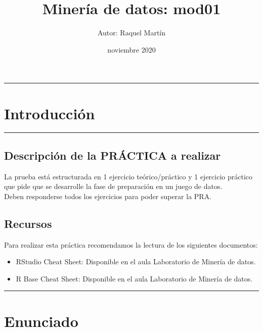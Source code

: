 \documentclass[]{article}
\title{Minería de datos: mod01}
\author{Autor: Raquel Martín}
\date{noviembre 2020}
\providecommand{\tightlist}{%
  \setlength{\itemsep}{0pt}\setlength{\parskip}{0pt}}
\begin{document}
\maketitle

{
\setcounter{tocdepth}{2}
\tableofcontents
}
\begin{center}\rule{0.5\linewidth}{0.5pt}\end{center}

\hypertarget{introduccion}{%
\section{Introducción}\label{introduccion}}

\begin{center}\rule{0.5\linewidth}{0.5pt}\end{center}

\hypertarget{descripcion-de-la-practica-a-realizar}{%
\subsection{Descripción de la PRÁCTICA a
realizar}\label{descripcion-de-la-practica-a-realizar}}

La prueba está estructurada en 1 ejercicio teórico/práctico y 1
ejercicio práctico que pide que se desarrolle la fase de preparación en
un juego de datos.\\
Deben responderse todos los ejercicios para poder superar la PRA.

\hypertarget{recursos}{%
\subsection{Recursos}\label{recursos}}

Para realizar esta práctica recomendamos la lectura de los siguientes
documentos:

\begin{itemize}
\tightlist
\item
  RStudio Cheat Sheet: Disponible en el aula Laboratorio de Minería de
  datos.\\
\item
  R Base Cheat Sheet: Disponible en el aula Laboratorio de Minería de
  datos.
\end{itemize}

\begin{center}\rule{0.5\linewidth}{0.5pt}\end{center}

\hypertarget{enunciado}{%
\section{Enunciado}\label{enunciado}}
\end{document}
